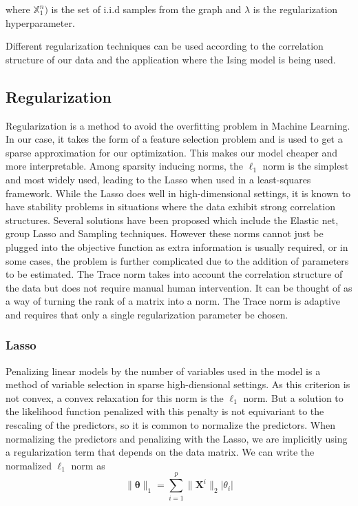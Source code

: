 \documentclass[11pt]{article}
\begin{document}
where $\mathbb{X}^n_1)$ is the set of i.i.d samples from the graph and $\lambda$ is the regularization hyperparameter. 

Different regularization techniques can be used according to the correlation structure of our data and the application where the Ising model is being used.

\subsection{Regularization}

Regularization is a method to avoid the overfitting problem in Machine Learning. 
In our case, it takes the form of a feature selection problem and is used to get a sparse approximation for our optimization. 
This makes our model cheaper and more interpretable. 
Among sparsity inducing norms, the $\ell_1$ norm is the simplest and most widely used, leading to the Lasso when used in a least-squares framework.
While the Lasso does well in high-dimensional settings, it is known to have stability problems in situations where the data exhibit strong correlation structures. 
Several solutions have been proposed which include the Elastic net, group Lasso and Sampling techniques. 
However these norms cannot just be plugged into the objective function as extra information is usually required, or in some cases, the problem is further complicated due to the addition of parameters to be estimated. 
The Trace norm takes into account the correlation structure of the data but does not require manual human intervention. 
It can be thought of as a way of turning the rank of a matrix into a norm. The Trace norm is adaptive and requires that only a single regularization parameter be chosen. 	


\subsubsection{Lasso}

Penalizing linear models by the number of variables used in the model is a method of variable selection in sparse high-diensional settings. 
As this criterion is not convex, a convex relaxation for this norm is the $\ell_1$ norm. 
But a solution to the likelihood function penalized with this penalty is not equivariant to the rescaling of the predictors, so it is common to normalize the predictors. 
When normalizing the predictors and penalizing with the Lasso, we are implicitly using a regularization term that depends on the data matrix. 
We can write the normalized $\ell_1$ norm as 
$$ \|\mathbf{\theta}\|_1 = \sum \limits_{i=1}^p \|{\mathbf{X}^i}\|_2 |\theta_i| $$ 
\end{document}
